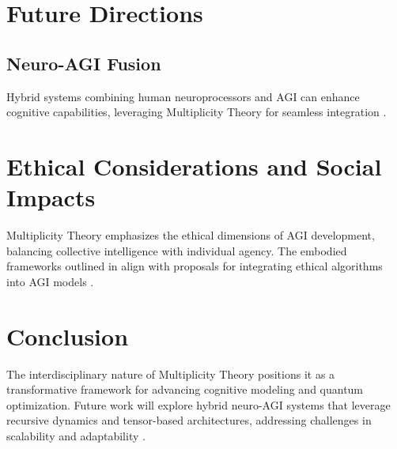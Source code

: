 \documentclass{article}
\theoremstyle{plain}
\begin{document}
\section{Future Directions}
\subsection{Neuro-AGI Fusion}
Hybrid systems combining human neuroprocessors and AGI can enhance cognitive capabilities, leveraging Multiplicity Theory for seamless integration \cite{Tegmark2017}.

\section{Ethical Considerations and Social Impacts}

Multiplicity Theory emphasizes the ethical dimensions of AGI development, balancing collective intelligence with individual agency. The embodied frameworks outlined in \cite{Varela1991} align with proposals for integrating ethical algorithms into AGI models \cite{Tegmark2017}.


\section{Conclusion}

The interdisciplinary nature of Multiplicity Theory positions it as a transformative framework for advancing cognitive modeling and quantum optimization. Future work will explore hybrid neuro-AGI systems that leverage recursive dynamics and tensor-based architectures, addressing challenges in scalability and adaptability \cite{Pribram1991, Penrose1994, Biamonte2017}.




\end{document}
